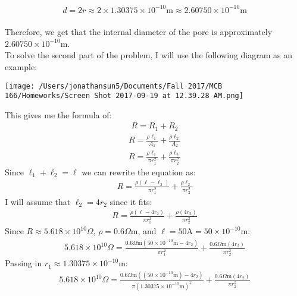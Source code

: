 \documentclass[11pt]{article}
\begin{document}
\begin{enumerate}[label=\arabic*.]
\begin{align*}
d = 2r \approx 2 \times 1.30375 \times 10^{-10} \text{m} \approx 2.60750 \times 10^{-10} \text{m}
\end{align*}
\vspace*{1\baselineskip}
\\
Therefore, we get that the internal diameter of the pore is approximately $2.60750 \times 10^{-10} \text{m}$.
\vspace*{1\baselineskip}
\\
To solve the second part of the problem, I will use the following diagram as an example:
\begin{center}
\texttt{[image: /Users/jonathansun5/Documents/Fall 2017/MCB 166/Homeworks/Screen Shot 2017-09-19 at 12.39.28 AM.png]}
\end{center}
This gives me the formula of:
\begin{align*}
R = R_1 + R_2
\end{align*}
\begin{align*}
R = \frac{\rho \ell_1} {A_1} + \frac{\rho \ell_2} {A_2}
\end{align*}
\begin{align*}
R = \frac{\rho \ell_1} {\pi r_1^2} + \frac{\rho \ell_2} {\pi r_2^2}
\end{align*}
Since $\ell_1 + \ell_2 = \ell$ we can rewrite the equation as:
\begin{align*}
R = \frac{\rho \left(\ell - \ell_2\right)} {\pi r_1^2} + \frac{\rho \ell_2} {\pi r_2^2}
\end{align*}
I will assume that $\ell_2 = 4r_2$ since it fits:
\begin{align*}
R = \frac{\rho \left(\ell - 4r_2\right)} {\pi r_1^2} + \frac{\rho \left(4r_2\right)} {\pi r_2^2}
\end{align*}
Since $R \approx 5.618 \times 10^{10} \Omega$, $\rho = 0.6 \Omega \text{m}$, and $\ell = 50 \text{A} = 50 \times 10^{-10} \text{m}$:
\begin{align*}
5.618 \times 10^{10} \Omega = \frac{0.6 \Omega \text{m} \left(50 \times 10^{-10} \text{m} - 4r_2\right)} {\pi r_1^2} + \frac{0.6 \Omega \text{m} \left(4r_2\right)} {\pi r_2^2}
\end{align*}
Passing in $r_1 \approx 1.30375 \times 10^{-10} \text{m}$:
\begin{align*}
5.618 \times 10^{10} \Omega = \frac{0.6 \Omega \text{m} \left((50 \times 10^{-10} \text{m}) - 4r_2\right)} {\pi (1.30375 \times 10^{-10} \text{m})^2} + \frac{0.6 \Omega \text{m} \left(4r_2\right)} {\pi r_2^2}
\end{align*}

\end{enumerate}
\end{document}
